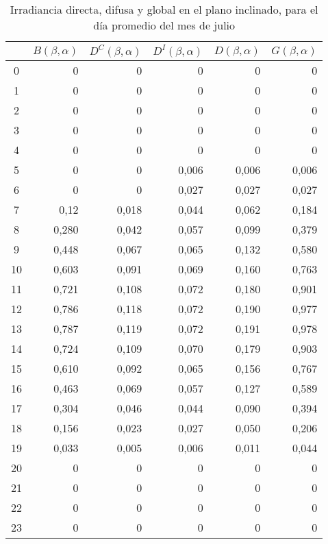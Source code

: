 \begin{table}[H]
\centering
\begin{tabular}{|c|r|r|r|r|r|}
\hline
 &
  \multicolumn{1}{c|}{$B(\beta, \alpha)$} &
  \multicolumn{1}{c|}{$D^C(\beta, \alpha)$} &
  \multicolumn{1}{c|}{$D^I(\beta, \alpha)$} &
  \multicolumn{1}{c|}{$D(\beta, \alpha)$} &
  \multicolumn{1}{c|}{$G(\beta, \alpha)$} \\ \hline
0  & 0     & 0     & 0     & 0     & 0     \\ \hline
1  & 0     & 0     & 0     & 0     & 0     \\ \hline
2  & 0     & 0     & 0     & 0     & 0     \\ \hline
3  & 0     & 0     & 0     & 0     & 0     \\ \hline
4  & 0     & 0     & 0     & 0     & 0     \\ \hline
5  & 0     & 0     & 0,006 & 0,006 & 0,006 \\ \hline
6  & 0     & 0     & 0,027 & 0,027 & 0,027 \\ \hline
7  & 0,12  & 0,018 & 0,044 & 0,062 & 0,184 \\ \hline
8  & 0,280 & 0,042 & 0,057 & 0,099 & 0,379 \\ \hline
9  & 0,448 & 0,067 & 0,065 & 0,132 & 0,580 \\ \hline
10 & 0,603 & 0,091 & 0,069 & 0,160 & 0,763 \\ \hline
11 & 0,721 & 0,108 & 0,072 & 0,180 & 0,901 \\ \hline
12 & 0,786 & 0,118 & 0,072 & 0,190 & 0,977 \\ \hline
13 & 0,787 & 0,119 & 0,072 & 0,191 & 0,978 \\ \hline
14 & 0,724 & 0,109 & 0,070 & 0,179 & 0,903 \\ \hline
15 & 0,610 & 0,092 & 0,065 & 0,156 & 0,767 \\ \hline
16 & 0,463 & 0,069 & 0,057 & 0,127 & 0,589 \\ \hline
17 & 0,304 & 0,046 & 0,044 & 0,090 & 0,394 \\ \hline
18 & 0,156 & 0,023 & 0,027 & 0,050 & 0,206 \\ \hline
19 & 0,033 & 0,005 & 0,006 & 0,011 & 0,044 \\ \hline
20 & 0     & 0     & 0     & 0     & 0     \\ \hline
21 & 0     & 0     & 0     & 0     & 0     \\ \hline
22 & 0     & 0     & 0     & 0     & 0     \\ \hline
23 & 0     & 0     & 0     & 0     & 0     \\ \hline
\end{tabular}
\caption{Irradiancia directa, difusa y global en el plano inclinado, para el día promedio del mes de julio \label{tab:hourly_tilted_values}}
\end{table}

